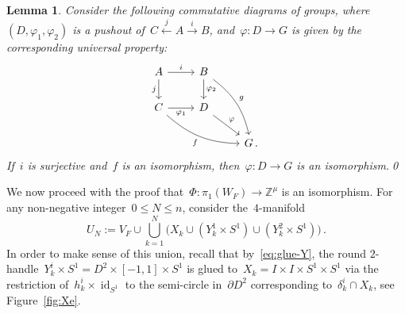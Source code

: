 \documentclass[10.9pt,a4paper]{amsart}
\newtheorem{lemma}[theorem]{Lemma}
\theoremstyle{definition}
\theoremstyle{remark}
\newcommand{\Z}{\mathbb{Z}}
\newcommand{\id}{\operatorname{id}}
\begin{document}
\begin{lemma}
\label{lemma:Pushout}
Consider the following commutative diagrams of groups, where~$(D, \varphi_1, \varphi_2)$ is a pushout of~$C\stackrel{j}{\leftarrow}A\stackrel{i}{\rightarrow}B$, and~$\varphi\colon D\to G$ is given by the corresponding universal property:
\[
\begin{tikzcd}
A \arrow[r, "i"] \arrow[d, "j"'] & B \arrow[d, "\varphi_2"] \arrow[ddr, bend left=20, "g"] & \\
C \arrow[r, "\varphi_1"'] \arrow[drr, bend right=20, "f"'] & D \arrow[dr, "\varphi"] & \\
& & G\,.
\end{tikzcd}
\]
If~$i$ is surjective and~$f$ is an isomorphism, then~$\varphi \colon  D \to G$ is an isomorphism.\qed
\end{lemma}

We now proceed with the proof that~$\Phi\colon\pi_1(W_F)\to\Z^\mu$ is an isomorphism. 
For any non-negative integer~$0\le N\le n$, consider
the~$4$-manifold
\[
U_N:=V_F \cup \bigcup_{k=1}^N \Big(X_k \cup \left(Y_k^1 \times S^1\right)\cup \left(Y_k^2 \times S^1\right)\Big)\,.
\]
In order to make sense of this union,
recall that by~\eqref{eq:glue-Y}, the round $2$-handle~$Y^i_k\times S^1=D^2\times [-1,1]\times S^1$ is glued to~$X_k=I\times I\times S^1\times S^1$ via the restriction of~$h_k^i\times\id_{S^1}$ to the semi-circle in~$\partial D^2$ corresponding to~$\delta_k^i\cap X_k$, see Figure~\ref{fig:Xe}.
\end{document}
